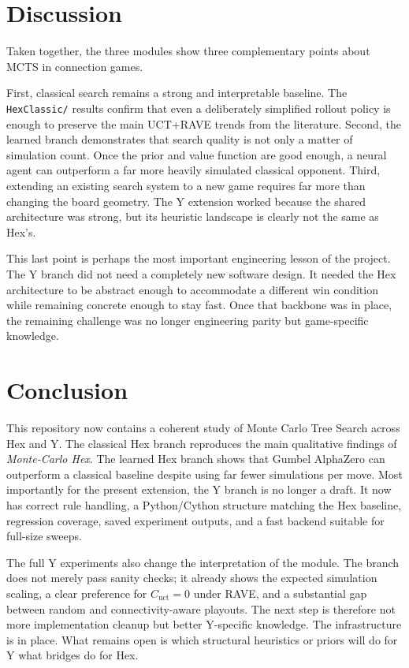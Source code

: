 \documentclass[11pt,a4paper]{article}
\begin{document}
\section{Discussion}

Taken together, the three modules show three complementary points about MCTS in
connection games.

First, classical search remains a strong and interpretable baseline. The
\texttt{HexClassic/} results confirm that even a deliberately simplified
rollout policy is enough to preserve the main UCT+RAVE trends from the
literature. Second, the learned branch demonstrates that search quality is not
only a matter of simulation count. Once the prior and value function are good
enough, a neural agent can outperform a far more heavily simulated classical
opponent. Third, extending an existing search system to a new game requires far
more than changing the board geometry. The Y extension worked because the
shared architecture was strong, but its heuristic landscape is clearly not the
same as Hex's.

This last point is perhaps the most important engineering lesson of the
project. The Y branch did not need a completely new software design. It needed
the Hex architecture to be abstract enough to accommodate a different win
condition while remaining concrete enough to stay fast. Once that backbone was
in place, the remaining challenge was no longer engineering parity but
game-specific knowledge.

\section{Conclusion}

This repository now contains a coherent study of Monte Carlo Tree Search across
Hex and Y. The classical Hex branch reproduces the main qualitative findings of
\emph{Monte-Carlo Hex}. The learned Hex branch shows that Gumbel AlphaZero can
outperform a classical baseline despite using far fewer simulations per move.
Most importantly for the present extension, the Y branch is no longer a draft.
It now has correct rule handling, a Python/Cython structure matching the Hex
baseline, regression coverage, saved experiment outputs, and a fast backend
suitable for full-size sweeps.

The full Y experiments also change the interpretation of the module. The branch
does not merely pass sanity checks; it already shows the expected simulation
scaling, a clear preference for $C_{\mathrm{uct}}=0$ under RAVE, and a
substantial gap between random and connectivity-aware playouts. The next step
is therefore not more implementation cleanup but better Y-specific knowledge.
The infrastructure is in place. What remains open is which structural
heuristics or priors will do for Y what bridges do for Hex.

\clearpage



\end{document}
